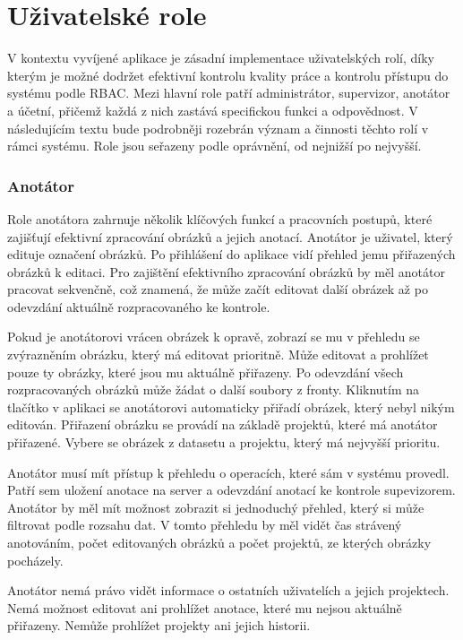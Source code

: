 \section{Uživatelské role}

V kontextu vyvíjené aplikace je zásadní implementace uživatelských rolí, díky kterým je možné dodržet efektivní kontrolu kvality práce a kontrolu přístupu do systému podle RBAC. Mezi hlavní role patří administrátor, supervizor, anotátor a účetní, přičemž každá z nich zastává specifickou funkci a odpovědnost. V následujícím textu bude podrobněji rozebrán význam a činnosti těchto rolí v rámci systému. Role jsou seřazeny podle oprávnění, od nejnižší po nejvyšší. 

\subsubsection{Anotátor}
Role anotátora zahrnuje několik klíčových funkcí a pracovních postupů, které zajišťují efektivní zpracování obrázků a jejich anotací. Anotátor je uživatel, který edituje označení obrázků.
Po přihlášení do aplikace vidí přehled jemu přiřazených obrázků k editaci. Pro zajištění efektivního zpracování obrázků by měl anotátor pracovat sekvenčně, což znamená, že může začít editovat další obrázek až po odevzdání aktuálně rozpracovaného ke kontrole.

Pokud je anotátorovi vrácen obrázek k opravě, zobrazí se mu v přehledu se zvýrazněním obrázku, který má editovat prioritně. Může editovat a prohlížet pouze ty obrázky, které jsou mu aktuálně přiřazeny. Po odevzdání všech rozpracovaných obrázků může žádat o další soubory z fronty. Kliknutím na tlačítko v aplikaci se anotátorovi automaticky přiřadí obrázek, který nebyl nikým editován. Přiřazení obrázku se provádí na základě projektů, které má anotátor přiřazené. Vybere se obrázek z datasetu a projektu, který má nejvyšší prioritu.

Anotátor musí mít přístup k přehledu o operacích, které sám v systému provedl. Patří sem uložení anotace na server a odevzdání anotací ke kontrole supevizorem. Anotátor by měl mít možnost zobrazit si jednoduchý přehled, který si může filtrovat podle rozsahu dat. V tomto přehledu by měl vidět čas strávený anotováním, počet editovaných obrázků a počet projektů, ze kterých obrázky pocházely.

Anotátor nemá právo vidět informace o ostatních uživatelích a jejich projektech. Nemá možnost editovat ani prohlížet anotace, které mu nejsou aktuálně přiřazeny. Nemůže prohlížet projekty ani jejich historii.

